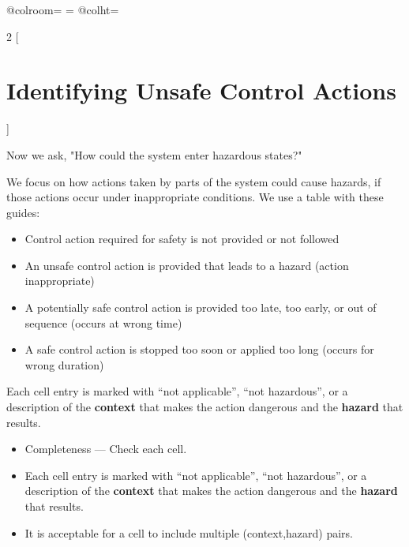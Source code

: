 \documentclass[a4paper]{tufte-book}
\begin{document}
\begin{landscape}
\advance{}
\csname @colroom\endcsname=\vsize
\textheight=\vsize
\csname @colht\endcsname=\vsize

\setlength{\parindent}{0em}
\setlength{\parskip}{.75em}

\begin{multicols}{2}
[ \section{Identifying Unsafe Control Actions}]


Now we ask, "How could the system enter hazardous states?"

We focus on how actions taken by parts of the system could cause hazards, if those actions occur under inappropriate conditions. 
We use a table with these guides:\begin{itemize}
\setlength{\itemsep}{0pt}
\setlength{\parskip}{.25em}
\item Control action required for safety is not provided or not followed
\item An unsafe control action is provided that leads to a hazard (action inappropriate)
\item A potentially safe control action is provided too late, too early, or out of sequence (occurs at wrong time)
\item A safe control action is stopped too soon or applied too long (occurs for wrong duration)
\end{itemize}

Each cell entry is marked with ``not applicable'', ``not hazardous'', or a description of the \textbf{context} that makes the action dangerous and the \textbf{hazard} that results. 




 \columnbreak
{} 
\begin{itemize}
\setlength{\itemsep}{0pt}
\setlength{\parskip}{.25em}
\item Completeness --- Check each cell.
\item Each cell entry is marked with ``not applicable'', ``not hazardous'', or a description of the \textbf{context} that makes the action dangerous and the \textbf{hazard} that results. 
\item It is acceptable for a cell to include multiple (context,hazard) pairs.
\end{itemize}


\end{multicols}
\end{landscape}
\end{document}
